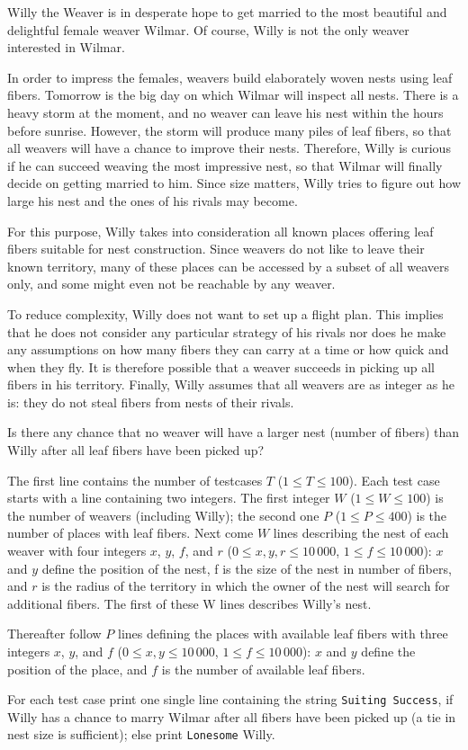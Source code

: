 Willy the Weaver is in desperate hope to get married to the most beautiful and delightful female weaver Wilmar.
Of course, Willy is not the only weaver interested in Wilmar.

In order to impress the females, weavers build elaborately woven nests using leaf fibers.
Tomorrow is the big day on which Wilmar will inspect all nests.
There is a heavy storm at the moment, and no weaver can leave his nest within the hours before sunrise.
However, the storm will produce many piles of leaf fibers, so that all weavers will have a chance to improve their nests.
Therefore, Willy is curious if he can succeed weaving the most impressive nest, so that Wilmar will finally decide on getting married to him.
Since size matters, Willy tries to figure out how large his nest and the ones of his rivals may become.

For this purpose, Willy takes into consideration all known places offering leaf fibers suitable for nest construction.
Since weavers do not like to leave their known territory, many of these places can be accessed by a subset of all weavers only, and some might even not be reachable by any weaver.

To reduce complexity, Willy does not want to set up a flight plan.
This implies that he does not consider any particular strategy of his rivals nor does he make any assumptions on how many fibers they can carry at a time or how quick and when they fly.
It is therefore possible that a weaver succeeds in picking up all fibers in his territory.
Finally, Willy assumes that all weavers are as integer as he is:
they do not steal fibers from nests of their rivals.

Is there any chance that no weaver will have a larger nest (number of fibers) than Willy after all leaf fibers have been picked up?

\begin{Input}
    The first line contains the number of testcases $T$ ($1 \leq T \leq 100$).
    Each test case starts with a line containing two integers.
    The first integer $W$ ($1 \leq W \leq 100$) is the number of weavers (including Willy);
    the second one $P$ ($1 \leq P \leq 400$) is the number of places with leaf fibers.
    Next come $W$ lines describing the nest of each weaver with four integers $x$, $y$, $f$, and $r$ ($0 \leq x, y, r \leq 10\,000$, $1 \leq f \leq 10\,000$): $x$ and $y$ define the position of the nest, f is the size of the nest in number of fibers, and $r$ is the radius of the territory in which the owner of the nest will search for additional fibers.
    The first of these W lines describes Willy’s nest.
    
    Thereafter follow $P$ lines defining the places with available leaf fibers with three integers $x$, $y$, and $f$ ($0 \leq x, y \leq 10\,000$, $1 \leq f \leq 10\,000$): $x$ and $y$ define the position of the place, and $f$ is the number of available leaf fibers.
\end{Input}

\begin{Output}
    For each test case print one single line containing the string \texttt{Suiting Success}, if Willy has a chance to marry Wilmar after all fibers have been picked up (a tie in nest size is sufficient);
    else print
    \texttt{Lonesome} Willy.
\end{Output}
